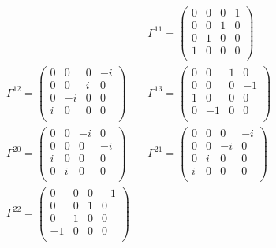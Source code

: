 \begin{align*}
    &&
    \Gamma^{11} = 
    \begin{pmatrix}
    0  &  0  &  0  &  1  \\
    0  &  0  &  1  &  0  \\
    0  &  1  &  0  &  0  \\
    1  &  0  &  0  &  0  \\
    \end{pmatrix}
    \\
    \Gamma^{12} = 
    \begin{pmatrix}
    0  &  0  &  0  &  -i  \\
    0  &  0  &  i  &  0  \\
    0  &  -i  &  0  &  0  \\
    i  &  0  &  0  &  0  \\
    \end{pmatrix}
    &&
    \Gamma^{13} = 
    \begin{pmatrix}
    0  &  0  &  1  &  0  \\
    0  &  0  &  0  &  -1  \\
    1  &  0  &  0  &  0  \\
    0  &  -1  &  0  &  0  \\
    \end{pmatrix}
    \\
    \Gamma^{20} = 
    \begin{pmatrix}
    0  &  0  &  -i  &  0  \\
    0  &  0  &  0  &  -i  \\
    i  &  0  &  0  &  0  \\
    0  &  i  &  0  &  0  \\
    \end{pmatrix}
    &&
    \Gamma^{21} = 
    \begin{pmatrix}
    0  &  0  &  0  &  -i  \\
    0  &  0  &  -i  &  0  \\
    0  &  i  &  0  &  0  \\
    i  &  0  &  0  &  0  \\
    \end{pmatrix}
    \\
    \Gamma^{22} = 
    \begin{pmatrix}
    0  &  0  &  0  &  -1  \\
    0  &  0  &  1  &  0  \\
    0  &  1  &  0  &  0  \\
    -1  &  0  &  0  &  0  \\
    \end{pmatrix}

\end{align*}
